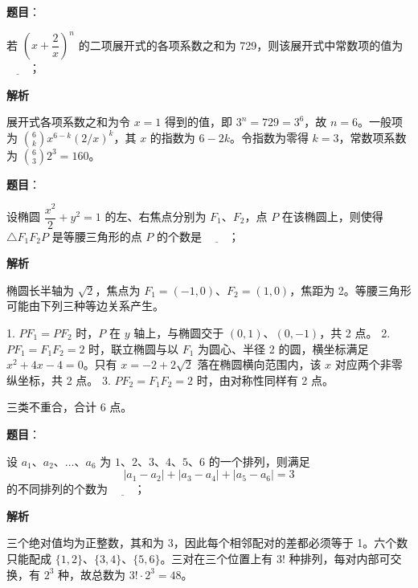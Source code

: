 \begin{answer}

\textbf{题目}：

若 $\left(x+\dfrac2x\right)^n$ 的二项展开式的各项系数之和为 729，则该展开式中常数项的值为 $\underline{\qquad}$；

\textbf{解析}

展开式各项系数之和为令 $x=1$ 得到的值，即 $3^n=729=3^6$，故 $n=6$。一般项为 $\binom6k x^{6-k}(2/x)^k$，其 $x$ 的指数为 $6-2k$。令指数为零得 $k=3$，常数项系数为 $\binom63 2^3=160$。


\end{answer}
\begin{answer}

\textbf{题目}：

设椭圆 $\dfrac{x^2}{2}+y^2=1$ 的左、右焦点分别为 $F_1\text{、}F_2$，点 $P$ 在该椭圆上，则使得 $\triangle F_1F_2P$ 是等腰三角形的点 $P$ 的个数是 $\underline{\qquad}$；

\textbf{解析}

椭圆长半轴为 $\sqrt2$，焦点为 $F_1=(-1,0)$、$F_2=(1,0)$，焦距为 2。等腰三角形可能由下列三种等边关系产生。

1. $PF_1=PF_2$ 时，$P$ 在 $y$ 轴上，与椭圆交于 $(0,1)$、$(0,-1)$，共 2 点。
2. $PF_1=F_1F_2=2$ 时，联立椭圆与以 $F_1$ 为圆心、半径 2 的圆，横坐标满足 $x^2+4x-4=0$。只有 $x=-2+2\sqrt2$ 落在椭圆横向范围内，该 $x$ 对应两个非零纵坐标，共 2 点。
3. $PF_2=F_1F_2=2$ 时，由对称性同样有 2 点。

三类不重合，合计 6 点。


\end{answer}
\begin{answer}

\textbf{题目}：

设 $a_1\text{、}a_2\text{、}\ldots\text{、}a_6$ 为 $1\text{、}2\text{、}3\text{、}4\text{、}5\text{、}6$ 的一个排列，则满足
\nopagebreak[4]
\[
|a_1-a_2|+|a_3-a_4|+|a_5-a_6|=3
\]
的不同排列的个数为 $\underline{\qquad}$；

\textbf{解析}

三个绝对值均为正整数，其和为 3，因此每个相邻配对的差都必须等于 1。六个数只能配成 $\{1,2\}$、$\{3,4\}$、$\{5,6\}$。三对在三个位置上有 $3!$ 种排列，每对内部可交换，有 $2^3$ 种，故总数为 $3!\cdot2^3=48$。


\end{answer}
